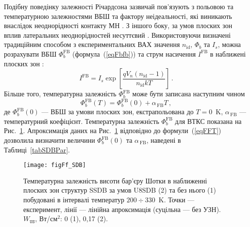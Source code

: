 \documentclass[a4paper,14pt,oneside,openany]{memoir}
\begin{document}
Подібну поведінку залежності Річардсона зазвичай пов'язують з польовою та температурною залежностями ВБШ та фактору неідеальності,
які виникають внаслідок неоднорідності контакту МН \cite{Sarpatwari,Aldemir}.
З іншого боку, за умов плоских зон вплив латеральних неоднорідностей несуттєвий \cite{Aldemir,Unewisse,Korkut}.
Використовуючи визначені традиційним способом з експериментальних ВАХ значення $n_\mathrm{id}$, $\Phi_b$ та $I_s$,
можна розрахувати ВБШ $\Phi_{b}^\mathrm{FB}$ (формула~(\ref{eqFbfb})) та струм насичення $I^\mathrm{FB}$ в наближені плоских зон \cite{Aldemir,Unewisse,Korkut}:
\begin{equation}\label{eqIfb}
I^\mathrm{FB}=I_s\exp\left[\frac{qV_n(n_\mathrm{id}-1)}{n_\mathrm{id}kT}\right]\,.
\end{equation}
Більше того, температурна залежність $\Phi_{b}^\mathrm{FB}$ може бути записана наступним чином
\begin{equation}
\label{eqFFT}
\Phi_{b}^\mathrm{FB}(T)=\Phi_{b}^\mathrm{FB}(0)+\alpha_\mathrm{\,FB} T \,,
\end{equation}
де
$\Phi_{b}^\mathrm{FB}(0)$ --- ВБШ за умови плоских зон, екстрапольована до $T = 0$~K,
$\alpha_\mathrm{\,FB}$ --- температурний коефіцієнт.
Температурна залежність $\Phi_{b}^\mathrm{FB}$ для ВТКС показана на Рис.~\ref{figFf_SDB}.
Апроксимація даних на Рис.~\ref{figFf_SDB} відповідно до формули~(\ref{eqFFT}) дозволила
визначити величини  $\Phi_{b}^\mathrm{FB}(0)$ та $\alpha_\mathrm{\,FB}$,
наведені в Таблиці~\ref{tabSDBPar}.


\begin{figure}
\center
\texttt{[image: figFf\_SDB]}
\caption{\label{figFf_SDB}
Температурна залежність висоти бар'єру Шотки в наближенні плоских зон
структур SSDB за умов U8SDB (2) та без нього (1) побудовані в інтервалі
температур $200\div330$~K.
Точки --- експеримент, лінії --- лінійна апроксимація (суцільна --- без УЗН).
$W_\mathtt{US}$,  Вт/см$^2$: 0 (1), 0,17 (2).
}%
\end{figure}
\end{document}
